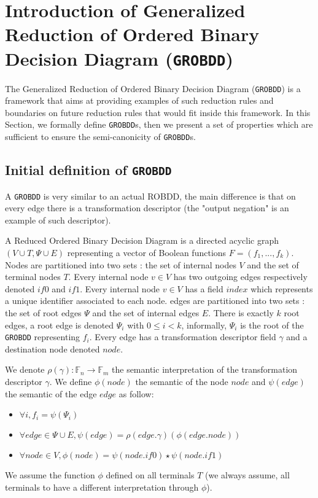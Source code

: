 \documentclass[a4paper,10pt]{article}
\newcommand{\F}{\mathbb{F}}
\newcommand{\GroBdd}{\texttt{GROBDD}}
\begin{document}
\section{Introduction of Generalized Reduction of Ordered Binary Decision Diagram (\GroBdd{})}

The Generalized Reduction of Ordered Binary Decision Diagram (\GroBdd{}) is a framework that aims at providing examples of such reduction rules and boundaries on future reduction rules that would fit inside this framework.
In this Section, we formally define \GroBdd{}s, then we present a set of properties which are sufficient to ensure the semi-canonicity of \GroBdd{}s.



\subsection{Initial definition of \GroBdd{}}

A \GroBdd{} is very similar to an actual ROBDD, the main difference is that on every edge there is a transformation  descriptor (the "output negation" is an example of such descriptor).

A Reduced Ordered Binary Decision Diagram is a directed acyclic graph $(V\cup T, \Psi \cup E)$ representing a vector of Boolean functions $F=(f_1, ..., f_k)$.
Nodes are partitioned into two sets : the set of internal nodes $V$ and the set of terminal nodes $T$.
Every internal node $v\in V$ has two outgoing edges respectively denoted $\mathit{if0}$ and $\mathit{if1}$.
Every internal node $v\in V$ has a field $\mathit{index}$ which represents a unique identifier associated to each node.
edges are partitioned into two sets : the set of root edges $\Psi$ and the set of internal edges $E$.
There is exactly $k$ root edges, a root edge is denoted $\Psi_i$ with $0\leq i < k$, informally, $\Psi_i$ is the root of the \GroBdd{} representing $f_i$.
Every edge has a transformation descriptor field $\gamma$ and a destination node denoted $\mathit{node}$.

We denote $\rho(\gamma) : \F_n \longrightarrow \F_m$ the semantic interpretation of the transformation descriptor $\gamma$.
We define $\phi(node)$ the semantic of the node $node$ and $\psi(edge)$ the semantic of the edge $edge$ as follow:\begin{itemize}
\item $\forall i, f_i = \psi(\Psi_i)$
\item $\forall edge \in \Psi \cup E, \psi(edge) = \rho(edge.\gamma)(\phi(edge.\mathit{node}))$
\item $\forall node \in V, \phi(node) = \psi(node.\mathit{if0}) \star \psi(node.\mathit{if1})$
\end{itemize}
We assume the function $\phi$ defined on all terminals $T$ (we always assume, all terminals to have a different interpretation through $\phi$).
\end{document}
